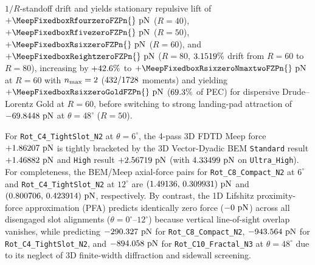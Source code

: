 \documentclass[11pt,letterpaper]{article}
\begin{document}
$1/R$-standoff drift and yields stationary repulsive lift of $+\MeepFixedboxRfourzeroFZPn{}\text{ pN}$ ($R=40$), $+\MeepFixedboxRfivezeroFZPn{}\text{ pN}$ ($R=50$), $+\MeepFixedboxRsixzeroFZPn{}\text{ pN}$ ($R=60$), and $+\MeepFixedboxReightzeroFZPn{}\text{ pN}$ ($R=80$, $3.1519{}\%$ drift from $R=60$ to $R=80$), increasing by $+42.6{}\%$ to $+\MeepFixedboxRsixzeroNmaxtwoFZPn{}\text{ pN}$ at $R=60$ with $n_{\rm max}=2$ ($432{}/1728{}$ moments) and yielding $+\MeepFixedboxRsixzeroGoldFZPn{}\text{ pN}$ ($69.3{}\%$ of PEC) for dispersive Drude--Lorentz Gold at $R=60$, before switching to strong landing-pad attraction of $-69.8448{}\text{ pN}$ at $\theta=48^\circ$ ($R=50$).

For \texttt{Rot\_C4\_TightSlot\_N2} at $\theta=6^\circ$, the 4-pass 3D FDTD Meep force $+1.86207{}\text{ pN}$ is tightly bracketed by the 3D Vector-Dyadic BEM \texttt{Standard} result $+1.46882{}\text{ pN}$ and \texttt{High} result $+2.56719{}\text{ pN}$ (with $4.33499{}\text{ pN}$ on \texttt{Ultra\_High}). For completeness, the BEM/Meep axial-force pairs for \texttt{Rot\_C8\_Compact\_N2} at $6^\circ$ and \texttt{Rot\_C4\_TightSlot\_N2} at $12^\circ$ are $(1.49136{},\,0.309931{})\text{ pN}$ and $(0.800706{},\,0.423914{})\text{ pN}$, respectively. By contrast, the 1D Lifshitz proximity-force approximation (PFA) predicts identically zero force ($-0{}\text{ pN}$) across all disengaged slot alignments ($\theta=0^\circ\text{--}12^\circ$) because vertical line-of-sight overlap vanishes, while predicting $-290.327{}\text{ pN}$ for \texttt{Rot\_C8\_Compact\_N2}, $-943.564{}\text{ pN}$ for \texttt{Rot\_C4\_TightSlot\_N2}, and $-894.058{}\text{ pN}$ for \texttt{Rot\_C10\_Fractal\_N3} at $\theta=48^\circ$ due to its neglect of 3D finite-width diffraction and sidewall screening.
\end{document}
